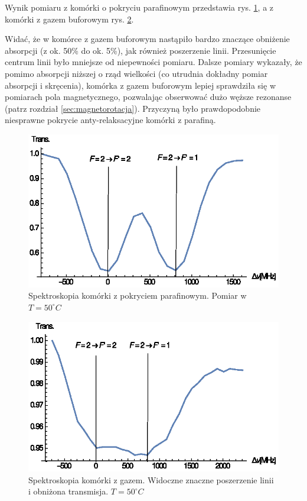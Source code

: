 \documentclass[a4paper,10pt,twoside]{article}
\begin{document}
Wynik pomiaru z komórki o pokryciu parafinowym przedstawia rys. \ref{fig:spekpara}, a z komórki z gazem buforowym rys. \ref{fig:spekgaz}.

Widać, że w komórce z gazem buforowym nastąpiło bardzo znaczące obniżenie absorpcji (z ok. 50\% do ok. 5\%), jak również poszerzenie linii. Przesunięcie centrum linii było mniejsze od niepewności pomiaru. Dalsze pomiary wykazały, że pomimo absorpcji niższej o rząd wielkości (co utrudnia dokładny pomiar absorpcji i skręcenia), komórka z gazem buforowym lepiej sprawdziła się w pomiarach pola magnetycznego, pozwalając obserwować dużo węższe rezonanse (patrz rozdział \ref{sec:magnetorotacja}). Przyczyną było prawdopodobnie niesprawne pokrycie anty-relaksacyjne komórki z parafiną.


\begin{figure}[h!]
\centering
 \includegraphics[width=\textwidth]{spek_para.eps}
 \caption{Spektroskopia komórki z pokryciem parafinowym. Pomiar w $T=50^{\circ}C$}
 \label{fig:spekpara}
\end{figure}



\begin{figure}[h!]
\centering
 \includegraphics[width=\textwidth]{spek_gaz.eps}
 \caption{Spektroskopia komórki z gazem. Widoczne znaczne poszerzenie linii i obniżona transmisja. $T=50^{\circ}C$}
 \label{fig:spekgaz}
\end{figure}
\end{document}
